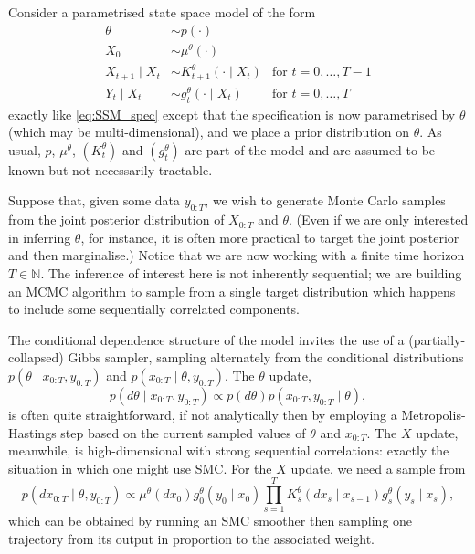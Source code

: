 Consider a parametrised state space model of the form
\begin{align*}
\theta &\sim p(\cdot) & \\
X_0 &\sim \mu^\theta(\cdot) & \\
X_{t+1} \mid X_{t} &\sim K_{t+1}^\theta(\cdot \mid X_{t}) &\text{for } t=0,\dots, T-1 \\
Y_t \mid X_t &\sim g_t^\theta(\cdot \mid X_t) &\text{for } t=0,\dots, T
\end{align*}
exactly like \eqref{eq:SSM_spec} except that the specification is now parametrised by $\theta$ (which may be multi-dimensional), and we place a prior distribution on $\theta$. 
As usual, $p$, $\mu^\theta$, $(K_t^\theta)$ and $(g_t^\theta)$ are part of the model and are assumed to be known but not necessarily tractable.

Suppose that, given some data $y_{0:T}$, we wish to generate Monte Carlo samples from the joint posterior distribution of $X_{0:T}$ and $\theta$. (Even if we are only interested in inferring $\theta$, for instance, it is often more practical to target the joint posterior and then marginalise.)
Notice that we are now working with a finite time horizon $T\in\mathbb{N}$. The inference of interest here is not inherently sequential; we are building an MCMC algorithm to sample from a single target distribution which happens to include some sequentially correlated components.


The conditional dependence structure of the model invites the use of a (partially-collapsed) Gibbs sampler, sampling alternately from the conditional distributions $p(\theta \mid x_{0:T}, y_{0:T})$ and $p(x_{0:T} \mid \theta, y_{0:T})$.
The $\theta$ update,
\begin{equation*}
p(d\theta \mid x_{0:T}, y_{0:T}) \propto p(d\theta) p(x_{0:T}, y_{0:T} \mid \theta) ,
\end{equation*}
is often quite straightforward, if not analytically then by employing a Metropolis-Hastings step based on the current sampled values of $\theta$ and $x_{0:T}$. 
The $X$ update, meanwhile, is high-dimensional with strong sequential correlations: exactly the situation in which one might use SMC. 
For the $X$ update, we need a sample from
\begin{equation}\label{eq:PG_Xposterior}
p(dx_{0:T} \mid \theta, y_{0:T}) 
\propto \mu^\theta(dx_0) g_0^\theta(y_0\mid x_0) \prod_{s=1}^T K_s^\theta(dx_s \mid x_{s-1}) g_s^\theta(y_s \mid x_s) ,
\end{equation}
which can be obtained by running an SMC smoother then sampling one trajectory from its output in proportion to the associated weight.

